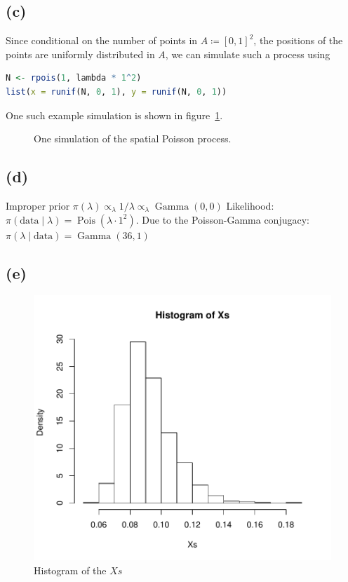 \documentclass{article}
\DeclareMathOperator\Poisson{Pois}
\DeclareMathOperator\GammaDist{Gamma}
\begin{document}
\subsection{(c)}
Since conditional on the number of points in $A \coloneqq [0, 1]^2$,
the positions of the points are uniformly distributed in $A$,
we can simulate such a process using
\begin{lstlisting}[language = R]
N <- rpois(1, lambda * 1^2)
list(x = runif(N, 0, 1), y = runif(N, 0, 1))
\end{lstlisting}
One such example simulation is shown in figure~\ref{fig:c_sim}.

\begin{figure}
	\centering
	
	\caption{One simulation of the spatial Poisson process. \label{fig:c_sim}}
\end{figure}

\subsection{(d)}
Improper prior $\pi(\lambda) \propto_\lambda 1/\lambda \propto_\lambda \GammaDist(0, 0)$
Likelihood: $\pi(\text{data} \mid \lambda) = \Poisson(\lambda \cdot 1^2)$.
Due to the Poisson-Gamma conjugacy: $\pi(\lambda \mid \text{data}) = \GammaDist(36, 1)$

\subsection{(e)}
\begin{figure}
    \centering
    \includegraphics[scale = 0.7]{Histo_Xs.pdf}
    \caption{Histogram of the $Xs$}
\end{figure}
\end{document}
